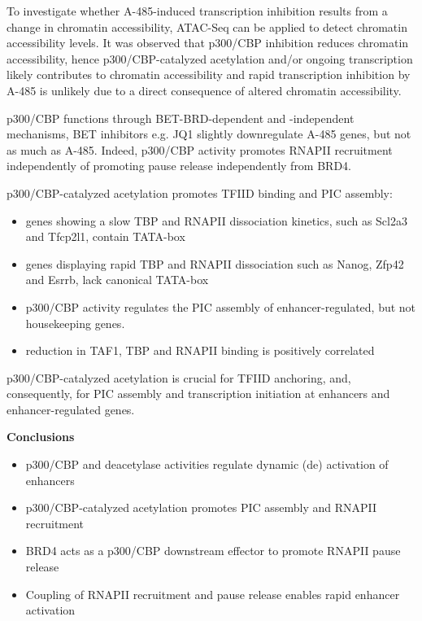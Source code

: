 To investigate whether A-485-induced transcription inhibition results from a change in chromatin accessibility, ATAC-Seq can be applied to detect chromatin accessibility levels. It was observed that p300/CBP inhibition reduces chromatin accessibility, hence p300/CBP-catalyzed acetylation and/or ongoing transcription likely contributes to chromatin accessibility and rapid transcription inhibition by A-485 is unlikely due to a direct consequence of altered chromatin accessibility.

p300/CBP functions through BET-BRD-dependent and -independent mechanisms, BET inhibitors e.g. JQ1 slightly downregulate A-485 genes, but not as much as A-485. Indeed, p300/CBP activity promotes RNAPII recruitment independently of promoting pause release independently from BRD4.

p300/CBP-catalyzed acetylation promotes TFIID binding and PIC assembly:
\begin{itemize}
\tightlist
\item genes showing a slow TBP and RNAPII dissociation kinetics, such as Scl2a3 and Tfcp2l1, contain
TATA-box
\item genes displaying rapid TBP and RNAPII dissociation such as Nanog, Zfp42 and Esrrb, lack
canonical TATA-box
\item p300/CBP activity regulates the PIC assembly of enhancer-regulated, but not housekeeping genes.
\item reduction in TAF1, TBP and RNAPII binding is positively correlated
\end{itemize}

p300/CBP-catalyzed acetylation is crucial for TFIID anchoring, and, consequently, for PIC assembly and transcription initiation at enhancers and enhancer-regulated genes.

\textbf{Conclusions}
\begin{itemize}
\tightlist
\item p300/CBP and deacetylase activities regulate dynamic (de) activation of enhancers
\item p300/CBP-catalyzed acetylation promotes PIC assembly and RNAPII recruitment
\item BRD4 acts as a p300/CBP downstream effector to promote RNAPII pause release
\item Coupling of RNAPII recruitment and pause release enables rapid enhancer activation
\end{itemize}

